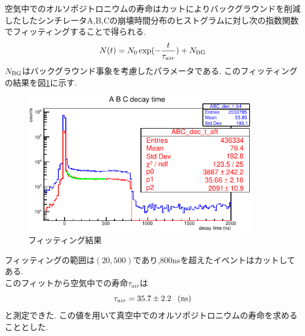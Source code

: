 空気中でのオルソポジトロニウムの寿命はカットによりバックグラウンドを削減したしたシンチレータA,B,Cの崩壊時間分布のヒストグラムに対し次の指数関数でフィッティングすることで得られる.\\
\begin{equation}
N(t)=N_0\exp(-\frac{t}{\tau_{air}})+N_{\rm BG}
\end{equation}
$N_{\rm BG}$はバックグラウンド事象を考慮したパラメータである.
このフィッティングの結果を図\ref{fig:life_in_air}に示す.
\begin{figure}[htbp]
	\begin{center}
		\includegraphics[width=10cm]{fig/isb/life_air.pdf}
		\caption{フィッティング結果}
		\label{fig:life_in_air}
	\end{center}
\end{figure}
フィッティングの範囲は$(20,500)$であり,800nsを超えたイベントはカットしてある.\\
このフィットから空気中での寿命$\tau_{air}$は\\
\begin{equation}
	\tau_{air}=35.7\pm 2.2 \hspace{8pt}(\rm ns)
\end{equation}
と測定できた.
この値を用いて真空中でのオルソポジトロニウムの寿命を求めることとした.

